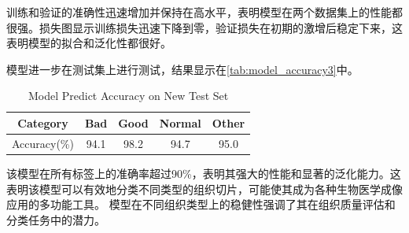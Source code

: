 训练和验证的准确性迅速增加并保持在高水平，表明模型在两个数据集上的性能都很强。损失图显示训练损失迅速下降到零，验证损失在初期的激增后稳定下来，这表明模型的拟合和泛化性都很好。

模型进一步在测试集上进行测试，结果显示在\autoref{tab:model_accuracy3}中。


\begin{table}[H]
    \centering
    \caption{Model Predict Accuracy on New Test Set}
    \begin{tabular}{c*{4}{c}}
        \toprule
        Category & Bad & Good & Normal & Other \\
        \midrule
        Accuracy(\%) & 94.1 & 98.2 & 94.7 & 95.0 \\
        \bottomrule
    \end{tabular}
    \label{tab:model_accuracy3}
\end{table}

该模型在所有标签上的准确率超过90\%，表明其强大的性能和显著的泛化能力。这表明该模型可以有效地分类不同类型的组织切片，可能使其成为各种生物医学成像应用的多功能工具。 模型在不同组织类型上的稳健性强调了其在组织质量评估和分类任务中的潜力。

\FloatBarrier